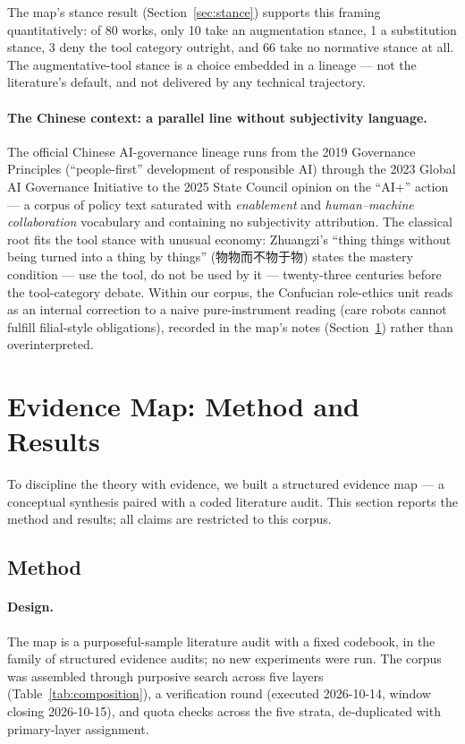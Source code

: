 \documentclass[10pt]{article}
\begin{document}
The map's stance result (Section~\ref{sec:stance}) supports this framing quantitatively: of 80 works, only 10 take an augmentation stance, 1 a substitution stance, 3 deny the tool category outright, and 66 take no normative stance at all. The augmentative-tool stance is a choice embedded in a lineage --- not the literature's default, and not delivered by any technical trajectory.

\paragraph{The Chinese context: a parallel line without subjectivity language.}
The official Chinese AI-governance lineage runs from the 2019 Governance Principles (``people-first'' development of responsible AI) \cite{govcn2019principles} through the 2023 Global AI Governance Initiative \cite{govcn2023initiative} to the 2025 State Council opinion on the ``AI+'' action \cite{govcn2025aiplus} --- a corpus of policy text saturated with \emph{enablement} and \emph{human--machine collaboration} vocabulary and containing no subjectivity attribution. The classical root fits the tool stance with unusual economy: Zhuangzi's ``thing things without being turned into a thing by things'' (物物而不物于物) \cite{zhuangzi2016complete} states the mastery condition --- use the tool, do not be used by it --- twenty-three centuries before the tool-category debate. Within our corpus, the Confucian role-ethics unit reads as an internal correction to a naive pure-instrument reading (care robots cannot fulfill filial-style obligations), recorded in the map's notes (Section~\ref{sec:evidencemap}) rather than overinterpreted.

\section{Evidence Map: Method and Results}\label{sec:evidencemap}

To discipline the theory with evidence, we built a structured evidence map --- a conceptual synthesis paired with a coded literature audit. This section reports the method and results; all claims are restricted to this corpus.

\subsection{Method}\label{sec:method}

\paragraph{Design.}
The map is a purposeful-sample literature audit with a fixed codebook, in the family of structured evidence audits; no new experiments were run. The corpus was assembled through purposive search across five layers (Table~\ref{tab:composition}), a verification round (executed 2026-10-14, window closing 2026-10-15), and quota checks across the five strata, de-duplicated with primary-layer assignment.
\end{document}
